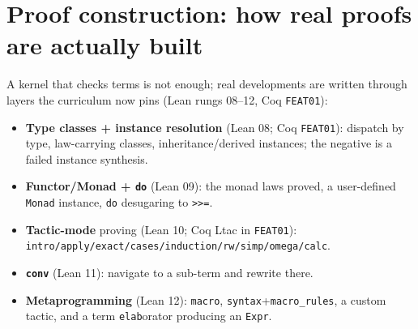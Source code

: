 \documentclass[11pt]{article}
\begin{document}
\section{Proof construction: how real proofs are actually built}
A kernel that checks terms is not enough; real developments are written through layers the curriculum
now pins (Lean rungs 08--12, Coq \texttt{FEAT01}):
\begin{itemize}\itemsep1pt
  \item \textbf{Type classes + instance resolution} (Lean 08; Coq \texttt{FEAT01}): dispatch by type,
        law-carrying classes, inheritance/derived instances; the negative is a failed instance synthesis.
  \item \textbf{Functor/Monad + \texttt{do}} (Lean 09): the monad laws proved, a user-defined
        \texttt{Monad} instance, \texttt{do} desugaring to \texttt{>>=}.
  \item \textbf{Tactic-mode} proving (Lean 10; Coq Ltac in \texttt{FEAT01}):
        \texttt{intro/apply/exact/cases/induction/rw/simp/omega/calc}.
  \item \textbf{\texttt{conv}} (Lean 11): navigate to a sub-term and rewrite there.
  \item \textbf{Metaprogramming} (Lean 12): \texttt{macro}, \texttt{syntax}+\texttt{macro\_rules}, a
        custom tactic, and a term \texttt{elab}orator producing an \texttt{Expr}.
\end{itemize}
\end{document}
